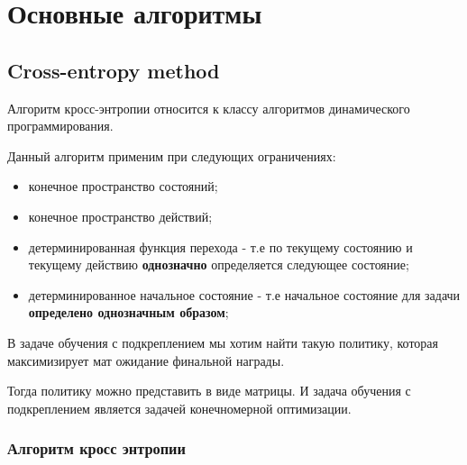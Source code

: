 \chapter{Основные алгоритмы}
\section{Cross-entropy method}
Алгоритм кросс-энтропии относится к классу алгоритмов динамического программирования.

Данный алгоритм применим при следующих ограничениях:
\begin{itemize}
	\item конечное пространство состояний;
	\item конечное пространство действий;
	\item детерминированная функция перехода - т.е по текущему состоянию и текущему действию \textbf{однозначно} определяется следующее состояние;
	\item детерминированное начальное состояние - т.е начальное состояние для задачи \textbf{определено однозначным образом}; 
\end{itemize}

В задаче обучения с подкреплением мы хотим найти такую политику, которая максимизирует мат ожидание финальной награды.

Тогда политику можно представить в виде матрицы. И задача обучения с подкреплением является задачей конечномерной оптимизации.

\subsection{Алгоритм кросс энтропии}

